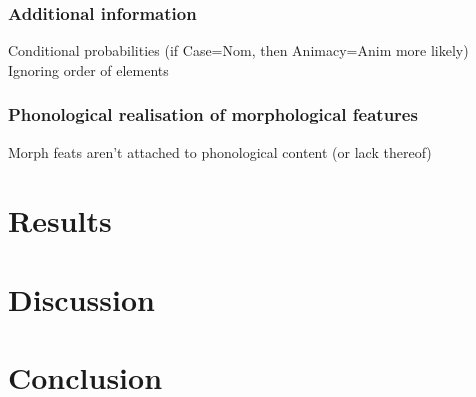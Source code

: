 \documentclass[USenglish]{article}
\begin{document}
\subsubsection{Additional information}
Conditional probabilities (if Case=Nom, then Animacy=Anim more likely)
Ignoring order of elements

\subsubsection{Phonological realisation of morphological features}
Morph feats aren't attached to phonological content (or lack thereof)




\section{Results}

\section{Discussion}

\section{Conclusion}





	
\end{document}
